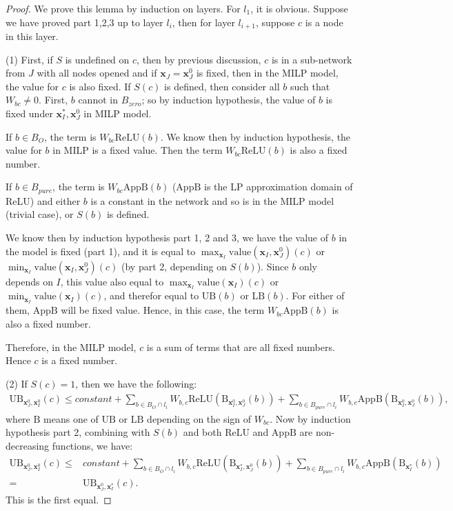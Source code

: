 \documentclass[]{article}
\theoremstyle{definition}
\newcommand{\ReLU}{\mathrm{ReLU}}
\newcommand{\Val}{\mathrm{value}}
\newcommand{\UB}{\mathrm{UB}}
\newcommand{\LB}{\mathrm{LB}}
\newcommand{\B}{\mathrm{B}}
\begin{document}
\begin{proof}
	We prove this lemma by induction on layers. For $l_1$, it is obvious. Suppose we have proved part 1,2,3 up to layer $l_i$, then for layer $l_{i+1}$, suppose $c$ is a node in this layer. 
	
(1)	First, if $S$ is undefined on $c$, then by previous discussion, $c$ is in a sub-network from $J$ with all nodes opened and if $\boldsymbol{x}_J=\boldsymbol{x}_J^0$ is fixed, then in the MILP model, the value for $c$ is also fixed. If $S(c)$ is defined, then consider all $b$ such that $W_{bc}\neq 0$. First, $b$ cannot in $B_{zero}$; so by induction hypothesis, the value of $b$ is fixed under $\boldsymbol{x}^*_I,\boldsymbol{x}^0_J$ in MILP model. 
	
	
	
	If $b\in B_O$, the term is $W_{bc}\ReLU(b)$. We know then by induction hypothesis, the value for $b$ in MILP is a fixed value. Then the term $W_{bc}\ReLU(b)$ is also a fixed number.  
	
	If $b\in B_{pure}$, the term is $W_{bc}\mathrm{AppB}(b)$ ($\mathrm{AppB}$ is the LP approximation domain of $\ReLU$) and either $b$ is a constant in the network and so is in the MILP model (trivial case), or $S(b)$ is defined. 
	
	We know then by induction hypothesis part 1, 2 and 3,  we have the value of $b$ in the model is fixed (part 1), and it is equal to $\max_{\boldsymbol{x}_I} \Val(\boldsymbol{x}_I,\boldsymbol{x}^0_J)(c)$ or $\min_{\boldsymbol{x}_I} \Val(\boldsymbol{x}_I,\boldsymbol{x}^0_J)(c)$ (by part 2, depending on $S(b)$). Since $b$ only depends on $I$, this value also equal to $\max_{\boldsymbol{x}_I} \Val(\boldsymbol{x}_I)(c)$ or $\min_{\boldsymbol{x}_I} \Val(\boldsymbol{x}_I)(c)$, and therefor equal to $\UB(b)$ or $\LB(b)$. For either of them, $\mathrm{AppB}$ will be fixed value. Hence, in this case, the term $W_{bc}\mathrm{AppB}(b)$ is also a fixed number.
	
	Therefore, in the MILP model, $c$ is a sum of terms that are all fixed numbers. Hence $c$ is a fixed number.
	
	(2) If $S(c)=1$, then we have the following:	\begin{align*}
		\mathrm{UB}_{\boldsymbol{x}^0_J,\boldsymbol{x}^0_I}(c) \leq constant + \sum_{b\in B_O\cap l_i} W_{b,c}\ReLU(\B_{\boldsymbol{x}^0_I,\boldsymbol{x}^0_J}(b)) + \sum_{b\in B_{pure}\cap l_{i}} W_{b,c} \mathrm{AppB}(\B_{\boldsymbol{x}^0_I,\boldsymbol{x}^0_J}(b)),
	\end{align*}where $\B$ means one of $\UB$ or $\LB$ depending on the sign of $W_{bc}$. Now by induction hypothesis part 2, combining with $S(b)$ and both $\ReLU$ and $\mathrm{AppB}$ are non-decreasing functions, we have:\begin{align*}
	\mathrm{UB}_{\boldsymbol{x}^0_J,\boldsymbol{x}^0_I}(c)\leq 
	&constant + \sum_{b\in B_O\cap l_i} W_{b,c}\ReLU(\B_{\boldsymbol{x}^*_I,\boldsymbol{x}^0_J}(b)) + \sum_{b\in B_{pure}\cap l_{i}} W_{b,c} \mathrm{AppB}(\B_{\boldsymbol{x}^*_I}(b))\\
	= & \mathrm{UB}_{\boldsymbol{x}^0_J,\boldsymbol{x}^*_I}(c). 
	\end{align*}  This is the first equal.
	

\end{proof}
\end{document}
